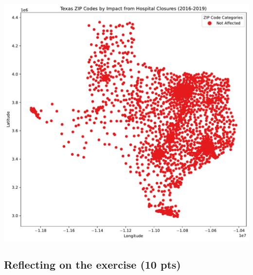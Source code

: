 \documentclass[
  letterpaper,
  DIV=11,
  numbers=noendperiod]{scrartcl}
\begin{document}
\includegraphics{pset4_template_files/figure-pdf/cell-25-output-1.pdf}

\subsection{Reflecting on the exercise (10
pts)}\label{reflecting-on-the-exercise-10-pts}
\end{document}

